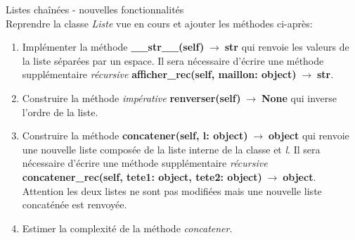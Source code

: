 \documentclass[a4paper,11pt]{article}
\begin{document}
\begin{Form}
\begin{exo}
Listes chaînées - nouvelles fonctionnalités\\
Reprendre la classe \emph{Liste} vue en cours et ajouter les méthodes ci-après:
\begin{enumerate}
\item Implémenter la méthode \textbf{\_\_str\_\_(self)$\;\rightarrow\;$str} qui renvoie les valeurs de la liste séparées par un espace. Il sera nécessaire d'écrire une méthode supplémentaire \textit{récursive} \textbf{afficher\_rec(self, maillon: object)$\;\rightarrow\;$str}.
\item Construire la méthode \emph{impérative} \textbf{renverser(self)$\;\rightarrow\;$None} qui inverse l'ordre de la liste.
\item Construire la méthode \textbf{concatener(self, l: object)$\;\rightarrow\;$object} qui renvoie une nouvelle liste composée de la liste interne de la classe et \emph{l}. Il sera nécessaire d'écrire une méthode supplémentaire \textit{récursive} \textbf{concatener\_rec(self, tete1: object, tete2: object)$\;\rightarrow\;$object}. Attention les deux listes ne sont pas modifiées mais une nouvelle liste concaténée est renvoyée.
\item Estimer la complexité de la méthode \emph{concatener}.
\end{enumerate}

\begin{figure}[!h]
\centering
{}
\end{figure}
\end{exo}
\end{Form}
\end{document}
